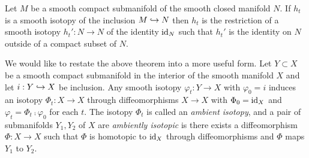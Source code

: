 \begin{theorem}
\label{thm:isotopyextension}

Let $M$ be a smooth compact submanifold of the smooth closed manifold $N$.
If $h_t$ is a smooth isotopy of the inclusion $M\hookrightarrow N$ then $h_t$ is the restriction of a smooth isotopy $h_t':N\to N$ of the identity $\textrm{id}_{N}$ such that $h_t'$ is the identity on $N$ outside of a compact subset of $N$.

\end{theorem}

We would like to restate the above theorem into a more useful form.
Let $Y\subset X$ be a smooth compact submanifold in the interior of the smooth manifold $X$ and let $i:Y\hookrightarrow X$ be inclusion.
Any smooth isotopy $\varphi_t:Y\to X$ with $\varphi_0=i$ induces an isotopy $\Phi_t:X\to X$ through diffeomorphisms $X\to X$ with $\Phi_0=\textrm{id}_{X}$ and $\varphi_t=\Phi_t\comp\varphi_0$ for each $t$.
The isotopy $\Phi_t$ is called an \emph{ambient isotopy}, and a pair of submanifolds $Y_1,Y_2$ of $X$ are \emph{ambiently isotopic} is there exists a diffeomorphism $\Phi:X\to X$ such that $\Phi$ is homotopic to $\textrm{id}_{X}$ through diffeomorphisms and $\Phi$ maps $Y_1$ to $Y_2$.
